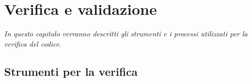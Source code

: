 
\chapter{Verifica e validazione}
\label{cap:verifica-validazione}

\textit{In questo capitolo verranno descritti gli strumenti e i processi utilizzati per la verifica del codice.}

\section{Strumenti per la verifica}
\label{sec:strumenti-per-verifica}

